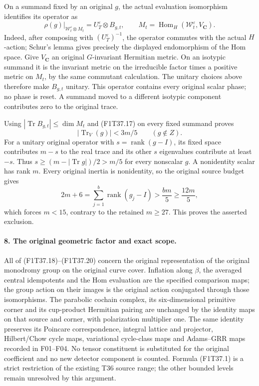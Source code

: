 On a summand fixed by an original \(g\), the actual
evaluation isomorphism identifies its operator as
\[
  \rho(g)|_{\mathcal W_t^\varepsilon\otimes M_t}
        =U_T^\varepsilon\otimes B_{g,t},
 \qquad M_t=\operatorname{Hom}_H
               (\mathcal W_t^\varepsilon,V_{\mathbf C}).
\tag{F1T37.18}
\]
Indeed, after composing with \((U_T^\varepsilon)^{-1}\),
the operator commutes with the actual \(H\)-action;
Schur's lemma gives precisely the displayed endomorphism
of the Hom space. Give \(V_{\mathbf C}\) an original
\(G\)-invariant Hermitian metric. On an isotypic summand
it is the invariant metric on the irreducible factor
times a positive metric on \(M_t\), by the same
commutant calculation. The unitary choices above
therefore make \(B_{g,t}\) unitary. This operator
contains every original scalar phase; no phase is reset.
A summand moved to a different isotypic component
contributes zero to the original trace.

Using \(|\operatorname{Tr}B_{g,t}|\le\dim M_t\)
and (F1T37.17) on every fixed summand proves
\[
                  |\operatorname{Tr}_V(g)|<3m/5
             \qquad(g\notin Z).
\tag{F1T37.19}
\]
For a unitary original operator with
\(s=\operatorname{rank}(g-I)\), its fixed space
contributes \(m-s\) to the real trace and its other
\(s\) eigenvalues contribute at least \(-s\).
Thus \(s\ge(m-|\operatorname{Tr}g|)/2>m/5\)
for every nonscalar \(g\). A nonidentity scalar has
rank \(m\). Every original inertia is nonidentity,
so the original source budget gives
\[
 2m+6=\sum_{j=1}^{b}\operatorname{rank}(g_j-I)
           >\frac{b m}{5}\ge\frac{12m}{5},
\tag{F1T37.20}
\]
which forces \(m<15\), contrary to the retained
\(m\ge27\). This proves the asserted exclusion.

\paragraph{8. The original geometric factor and exact scope.}
All of (F1T37.18)--(F1T37.20) concern the original
representation of the original monodromy group on
the original curve cover. Inflation along \(\beta\),
the averaged central idempotents and the Hom evaluation
are the specified comparison maps; the group action
on their images is the original action conjugated
through those isomorphisms. The parabolic cochain
complex, its six-dimensional primitive corner and
its cup-product Hermitian pairing are unchanged by
the identity maps on that source and corner, with
polarization multiplier one. The same identity
preserves its Poincare correspondence, integral
lattice and projector, Hilbert/Chow cycle maps,
variational cycle-class maps and Adams--GRR maps
recorded in F01--F04. No tensor constituent is
substituted for the original coefficient and no new
detector component is counted. Formula (F1T37.1)
is a strict restriction of the existing T36 source
range; the other bounded levels remain unresolved
by this argument.

